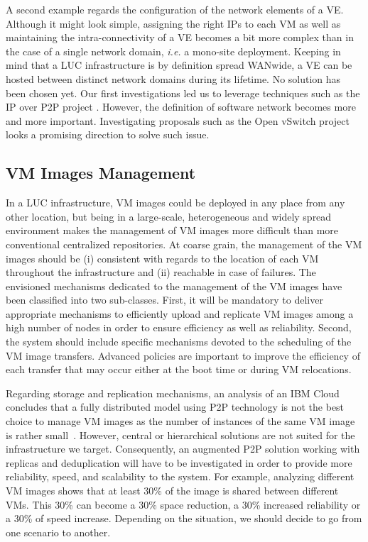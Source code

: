 A second example regards the configuration of the network elements of a VE. 
Although it might look simple, assigning the right IPs to
each VM as well as maintaining the intra-connectivity of a VE becomes a bit more complex than in
the case of a single network domain, \textit{i.e.} a mono-site deployment.
%
Keeping in mind that a LUC infrastructure is
by definition spread WANwide, a VE can be hosted between distinct network
domains during its lifetime. No solution has been chosen yet. 
Our first investigations led us to leverage techniques
such as the IP over P2P project \cite{ganguly:2006}. However, the definition of
software network becomes more and more important. Investigating proposals such as
the Open vSwitch project \cite{pfaff:2009} looks a promising direction to solve such issue.
%

\subsection{VM Images Management}

In a LUC infrastructure, VM images could be deployed in any place from any
other location, but being in a large-scale, heterogeneous and widely spread
environment makes the management of VM images more difficult than more
conventional  centralized repositories.  
At coarse grain, the management of the VM images should be (i) consistent
with regards to the location of each VM throughout the \discovery infrastructure and
(ii) reachable in case of failures.
%
The envisioned mechanisms dedicated to the management of the VM images have been
classified into two sub-classes.
%
First, it will be mandatory to deliver appropriate mechanisms to efficiently
upload and replicate VM images among a high number of nodes in order to ensure
efficiency as well as reliability.  Second, the \discovery system should 
include specific mechanisms devoted to the scheduling of the VM image
transfers. Advanced policies are important to improve the efficiency of each
transfer that may occur either at the boot time or during VM relocations. 

Regarding storage and replication mechanisms,  an analysis of an IBM Cloud concludes
that a fully distributed model using P2P technology is not the best choice to manage VM images as the
number of instances of the same VM image is rather small~\cite{peng:2012}. However, central or
hierarchical solutions are not suited for the infrastructure we target.
Consequently, an augmented P2P solution working with replicas and
deduplication will have to be investigated in order to provide more
reliability, speed, and scalability to the system. For example, analyzing
different VM images shows that at least 30\% of the image is shared between
different VMs. This 30\% can become a 30\% space reduction, a
30\% increased reliability or a 30\% of speed increase. Depending on the
situation, we should decide to go from one scenario to another. 

